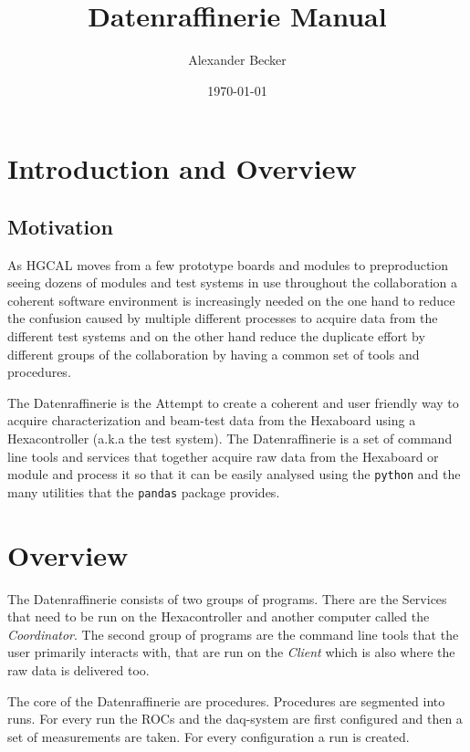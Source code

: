 \documentclass[11pt]{article}
\title{Datenraffinerie Manual}
\author{Alexander Becker}
\date{\today}
\begin{document}
\maketitle
\tableofcontents
\pagebreak
\section{Introduction and Overview}
\subsection{Motivation}
As HGCAL moves from a few prototype boards and modules to preproduction seeing dozens of modules and test systems in use throughout the collaboration a coherent software environment is increasingly needed on the one hand to reduce the confusion caused by multiple different processes to acquire data from the different test systems and on the other hand reduce the duplicate effort by different groups of the collaboration by having a common set of tools and procedures.

The Datenraffinerie is the Attempt to create a coherent and user friendly way to acquire characterization and beam-test data from the Hexaboard using a Hexacontroller (a.k.a the test system). The Datenraffinerie is a set of command line tools and services that together acquire raw data from the Hexaboard or module and process it so that it can be easily analysed using the \texttt{python} and the many utilities that the \texttt{pandas} package provides.

\section{Overview}
The Datenraffinerie consists of two groups of programs. There are the Services that need to be run on the Hexacontroller and another computer called the \emph{Coordinator}. The second group of programs are the command line tools that the user primarily interacts with, that are run on the \emph{Client} which is also where the raw data is delivered too.

The core of the Datenraffinerie are procedures. Procedures are segmented into runs. For every run the ROCs and the daq-system are first configured and then a set of measurements are taken. For every configuration a run is created. 
\end{document}
